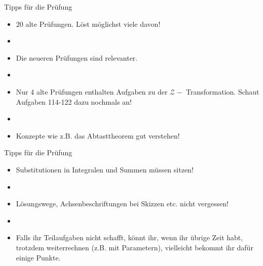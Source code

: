 \documentclass[14pt, aspectratio=169, handout]{beamer}
\begin{document}
\begin{frame}{Tipps für die Prüfung}
    \begin{itemize}
        \item 20 alte Prüfungen. Löst möglichst viele davon!
        \item[] 
        \item Die neueren Prüfungen sind relevanter.
        \item[] 
        \item Nur 4 alte Prüfungen enthalten Aufgaben zu der $\mathcal{Z}-$ Transformation. Schaut Aufgaben 114-122 dazu nochmals an!
        \item[] 
        \item Konzepte wie z.B. das Abtasttheorem gut verstehen!
    \end{itemize}
\end{frame}

\begin{frame}{Tipps für die Prüfung}
    \begin{itemize}
        \item Substitutionen in Integralen und Summen müssen sitzen!
        \item[] 
        \item Lösungswege, Achsenbeschriftungen bei Skizzen etc. nicht vergessen!
        \item[] 
        \item Falls ihr Teilaufgaben nicht schafft, könnt ihr, wenn ihr übrige Zeit habt, trotzdem weiterrechnen (z.B. mit Parametern), vielleicht bekommt ihr dafür einige Punkte.
    \end{itemize}
\end{frame}
\end{document}

